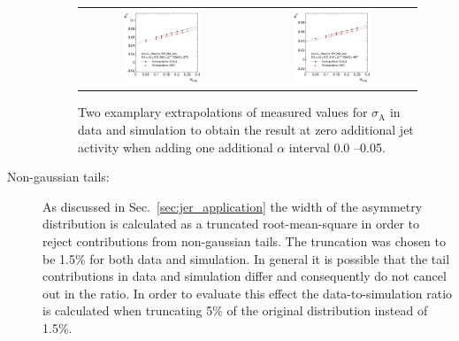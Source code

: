 \begin{description}
\begin{figure}[tp]
  \centering
  \begin{tabular}{cc}
                \includegraphics[width=0.49\textwidth]{figures/Extrapol_Eta0_pt4_final_nominal_NoMinPtCutForThirdJet_AddNewAlphaBin_v4.pdf} &
                \includegraphics[width=0.49\textwidth]{figures/Extrapol_Eta0_pt9_final_nominal_NoMinPtCutForThirdJet_AddNewAlphaBin_v4.pdf}
  \end{tabular}
  \caption{Two examplary extrapolations of measured values for $\sigma_\mathrm{A}$ in data and simulation to obtain the result at zero additional jet activity when adding one additional $\alpha$ interval 0.0 --0.05.}
  \label{fig:syst_uncert_alpha_range}
\end{figure}

\item[Non-gaussian tails:] As discussed in Sec.~\ref{sec:jer_application} the width of the asymmetry distribution is calculated as a truncated root-mean-square in order to reject contributions from non-gaussian tails. The truncation was chosen to be 1.5\% for both data and simulation. In general it is possible that the tail contributions in data and simulation differ and consequently do not cancel out in the ratio. In order to evaluate this effect the data-to-simulation ratio is calculated when truncating 5\% of the original distribution instead of 1.5\%.  


\end{description}
